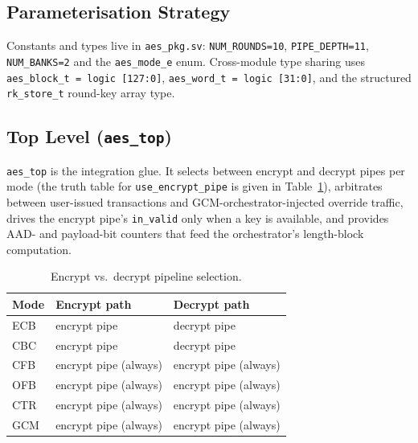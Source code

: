 \documentclass[conference,10pt,a4paper]{IEEEtran}
\begin{document}
\subsection{Parameterisation Strategy}
Constants and types live in \texttt{aes\_pkg.sv}:
\texttt{NUM\_ROUNDS=10}, \texttt{PIPE\_DEPTH=11}, \texttt{NUM\_BANKS=2}
and the \texttt{aes\_mode\_e} enum.  Cross-module type sharing uses
\texttt{aes\_block\_t = logic [127:0]}, \texttt{aes\_word\_t = logic
[31:0]}, and the structured \texttt{rk\_store\_t} round-key array type.

\subsection{Top Level (\texttt{aes\_top})}
\texttt{aes\_top} is the integration glue. It selects between encrypt and
decrypt pipes per mode (the truth table for \texttt{use\_encrypt\_pipe}
is given in Table~\ref{tab:pipe-sel}), arbitrates between user-issued
transactions and GCM-orchestrator-injected override traffic, drives the
encrypt pipe's \texttt{in\_valid} only when a key is available, and
provides AAD- and payload-bit counters that feed the orchestrator's
length-block computation.

\begin{table}[t]
\caption{Encrypt vs.\ decrypt pipeline selection.}
\label{tab:pipe-sel}
\centering
\begin{tabular}{l l l}
\toprule
\textbf{Mode} & \textbf{Encrypt path} & \textbf{Decrypt path} \\
\midrule
ECB & encrypt pipe                 & decrypt pipe \\
CBC & encrypt pipe                 & decrypt pipe \\
CFB & encrypt pipe (always)        & encrypt pipe (always) \\
OFB & encrypt pipe (always)        & encrypt pipe (always) \\
CTR & encrypt pipe (always)        & encrypt pipe (always) \\
GCM & encrypt pipe (always)        & encrypt pipe (always) \\
\bottomrule
\end{tabular}
\end{table}
\end{document}
